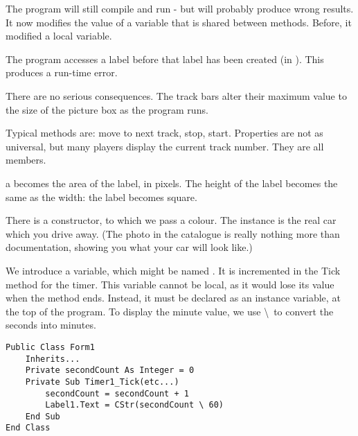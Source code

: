 		\begin{stab}
			\begin{enumChapter}
				\item	The program will still compile and run - but will probably produce wrong results. It now modifies the value of a variable that is shared between methods. Before, it modified a local variable.
				\item The program accesses a label before that label has been created (in ). This produces a run-time error.
				\item There are no serious consequences. The track bars alter their maximum value to the size of the picture box as the program runs.
				\item Typical methods are: move to next track, stop, start. Properties are not as universal, but many players display the current track number. They are all members.
				\item a becomes the area of the label, in pixels.	The height of the label becomes the same as the width: the label becomes square.
				\item There is a constructor, to which we pass a colour. The instance is the real car which you drive away. (The photo in the catalogue is really nothing more than documentation, showing you what your car will look like.)
				\item We introduce a variable, which might be named . It is incremented in the Tick method for the timer. This variable cannot be local, as it would lose its value when the method ends. Instead, it must be declared as an instance variable, at the top of the program. To display the minute value, we use \textbackslash\ to convert the seconds into minutes.
					\begin{lstlisting}
Public Class Form1
	Inherits...
	Private secondCount As Integer = 0
	Private Sub Timer1_Tick(etc...)
		secondCount = secondCount + 1
		Label1.Text = CStr(secondCount \ 60)
	End Sub
End Class
					\end{lstlisting}
			\end{enumChapter}
		\end{stab}


